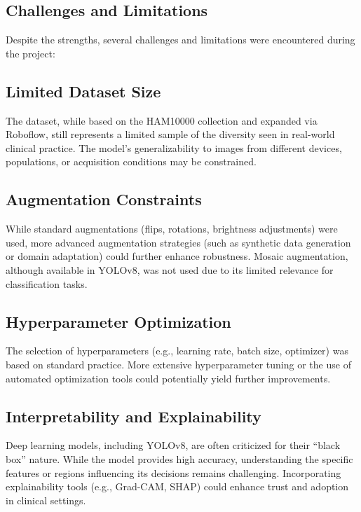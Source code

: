 \documentclass[a4paper,12pt]{report}
\begin{document}
\begin{spacing}{1.5}
    \newpage

    \section{Challenges and Limitations}
    
    Despite the strengths, several challenges and limitations were encountered during the project:
    
        \subsection*{Limited Dataset Size}
        The dataset, while based on the HAM10000 collection and expanded via Roboflow, still represents a limited sample of the diversity seen in real-world clinical practice. The model’s generalizability to images from different devices, populations, or acquisition conditions may be constrained.
        
        \subsection*{Augmentation Constraints}
        While standard augmentations (flips, rotations, brightness adjustments) were used, more advanced augmentation strategies (such as synthetic data generation or domain adaptation) could further enhance robustness. Mosaic augmentation, although available in YOLOv8, was not used due to its limited relevance for classification tasks.
        
        \subsection*{Hyperparameter Optimization}
        The selection of hyperparameters (e.g., learning rate, batch size, optimizer) was based on standard practice. More extensive hyperparameter tuning or the use of automated optimization tools could potentially yield further improvements.
        
        \subsection*{Interpretability and Explainability}
        Deep learning models, including YOLOv8, are often criticized for their “black box” nature. While the model provides high accuracy, understanding the specific features or regions influencing its decisions remains challenging. Incorporating explainability tools (e.g., Grad-CAM, SHAP) could enhance trust and adoption in clinical settings.
        

\end{spacing}
\end{document}

